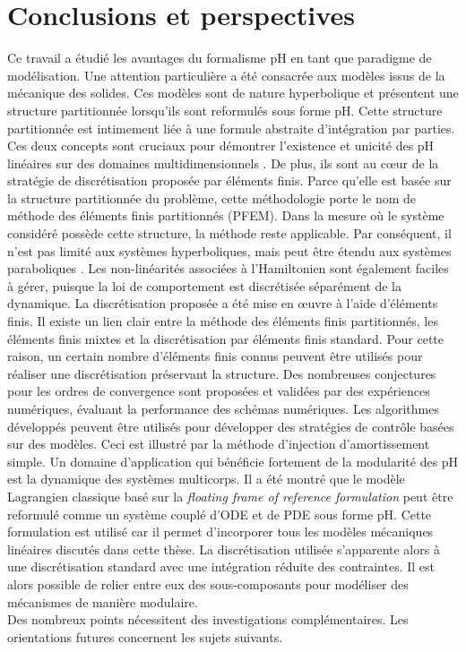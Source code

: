 \section{Conclusions et perspectives}

Ce travail a étudié les avantages du formalisme pH en tant que paradigme de modélisation. Une attention particulière a été consacrée aux modèles issus de la mécanique des solides. Ces modèles sont de nature hyperbolique et présentent une structure partitionnée lorsqu'ils sont reformulés sous forme pH. Cette structure partitionnée est intimement liée à une formule abstraite d'intégration par parties. Ces deux concepts sont cruciaux pour démontrer l'existence et unicité des pH linéaires sur des domaines multidimensionnels \cite{skrepek2019wellposedness}. De plus, ils sont au c\oe{}ur de la stratégie de discrétisation proposée par éléments finis. Parce qu'elle est basée sur la structure partitionnée du problème, cette méthodologie porte le nom de méthode des éléments finis partitionnés (PFEM). Dans la mesure où le système considéré possède cette structure, la méthode reste applicable. Par conséquent, il n'est pas limité aux systèmes hyperboliques, mais peut être étendu aux systèmes paraboliques \cite{serhani2019discretization}. Les non-linéarités associées à l'Hamiltonien sont également faciles à gérer, puisque la loi de comportement est discrétisée séparément de la dynamique. La discrétisation proposée a été mise en \oe{}uvre à l'aide d'éléments finis. Il existe un lien clair entre la méthode des éléments finis partitionnés, les éléments finis mixtes et la discrétisation par éléments finis standard. Pour cette raison, un certain nombre d'éléments finis connus peuvent être utilisés pour réaliser une discrétisation préservant la structure. Des nombreuses conjectures pour les ordres de convergence sont proposées et validées par des expériences numériques, évaluant la performance des schémas numériques. Les algorithmes développés peuvent être utilisés pour développer des stratégies de contrôle basées sur des modèles. Ceci est illustré par la méthode d'injection d'amortissement simple. Un domaine d'application qui bénéficie fortement de la modularité des pH est la dynamique des systèmes multicorps. Il a été montré que le modèle Lagrangien classique basé sur la \textit{floating frame of reference formulation} peut être reformulé comme un système couplé d'ODE et de PDE sous forme pH. Cette formulation est utilisé car il permet d'incorporer tous les modèles mécaniques linéaires discutés dans cette thèse. La discrétisation utilisée s'apparente alors à une discrétisation standard avec une intégration réduite des contraintes. Il est alors possible de relier entre eux des sous-composants pour modéliser des mécanismes de manière modulaire. \\ Des nombreux points nécessitent des investigations complémentaires. Les orientations futures  concernent les sujets suivants.

